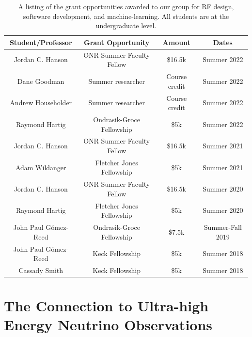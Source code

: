 \documentclass[../../main.tex]{subfiles}
\begin{document}
\begin{table}
\centering
\begin{tabular}{c c c c}
Student/Professor & Grant Opportunity & Amount & Dates \\ \hline
Jordan C. Hanson & ONR Summer Faculty Fellow & \$16.5k & Summer 2022 \\
Dane Goodman & Summer researcher & Course credit & Summer 2022 \\
Andrew Householder & Summer researcher & Course credit & Summer 2022 \\
Raymond Hartig & Ondrasik-Groce Fellowship & \$5k & Summer 2022 \\
Jordan C. Hanson & ONR Summer Faculty Fellow & \$16.5k & Summer 2021 \\
Adam Wildanger & Fletcher Jones Fellowship & \$5k & Summer 2021 \\
Jordan C. Hanson & ONR Summer Faculty Fellow & \$16.5k & Summer 2020 \\
Raymond Hartig & Fletcher Jones Fellowship & \$5k & Summer 2020 \\
John Paul G\'{o}mez-Reed & Ondrasik-Groce Fellowship & \$7.5k & Summer-Fall 2019 \\
John Paul G\'{o}mez-Reed & Keck Fellowship & \$5k & Summer 2018 \\
Cassady Smith & Keck Fellowship & \$5k & Summer 2018 \\
\end{tabular}
\caption{\label{tab:funds} A listing of the grant opportunities awarded to our group for RF design, softrware development, and machine-learning.  All students are at the undergraduate level.}
\end{table}


\section{The Connection to Ultra-high Energy Neutrino Observations}
\label{sec:askaryan}
\end{document}
